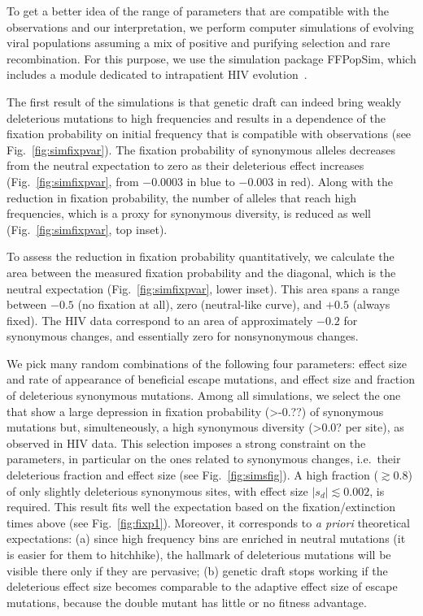 \documentclass[rmp, twocolumn]{revtex4}
\newcommand{\FIG}[1]{Fig.~\ref{fig:#1}}
\begin{document}
To get a better idea of the range of parameters that are compatible with the
observations and our interpretation, we perform computer simulations of
evolving viral populations assuming a mix of positive and purifying selection
and rare recombination.
For this purpose, we use the simulation package FFPopSim, which includes a
module dedicated to intrapatient HIV evolution~\citep{zanini_ffpopsim:_2012}. 

The first result of the simulations is that genetic draft can indeed bring weakly
deleterious mutations to high frequencies and results in a dependence of the
fixation probability on initial frequency that is compatible with observations
(see \FIG{simfixpvar}).
The fixation probability of synonymous alleles decreases from the neutral
expectation to zero as their deleterious effect increases
(\FIG{simfixpvar}, from $-0.0003$ in blue to $-0.003$ in red). Along with the
reduction in fixation probability, the number of alleles that reach high
frequencies, which is a proxy for synonymous diversity, is reduced as well (\FIG{simfixpvar}, top inset).

To assess the reduction in fixation probability quantitatively, we calculate
the area between the measured fixation probability and the diagonal, which is
the neutral expectation (\FIG{simfixpvar}, lower inset). This area spans a range
between $-0.5$ (no fixation at all), zero (neutral-like curve), and $+0.5$ (always
fixed). The HIV data correspond to an area of approximately $-0.2$ for synonymous
changes, and essentially zero for nonsynonymous changes.

We pick many random combinations of the following four parameters: effect size
and rate of appearance of beneficial escape mutations, and effect size and
fraction of deleterious synonymous mutations.
Among all simulations, we select the one that show a large depression in
fixation probability (>-0.??) of synonymous mutations but, simulteneously, a
high synonymous diversity (>0.0? per site), as observed in HIV data. This
selection imposes a strong constraint on the parameters, in particular on the
ones related to synonymous changes, i.e.~their deleterious fraction and effect
size (see \FIG{simsfig}).
A high fraction ($\gtrsim 0.8$) of only slightly deleterious synonymous sites,
with effect size $|s_d| \lesssim 0.002$, is required. This result fits well the
expectation based on the fixation/extinction times above (see \FIG{fixp1}).
Moreover, it corresponds to {\it a priori} theoretical expectations:
(a) since high frequency bins are enriched in neutral mutations (it is easier
for them to hitchhike), the hallmark of deleterious mutations will be visible
there only if they are pervasive; (b) genetic draft stops working if the
deleterious effect size becomes comparable to the adaptive effect size of escape
mutations, because the double mutant has little or no fitness advantage.
\end{document}
